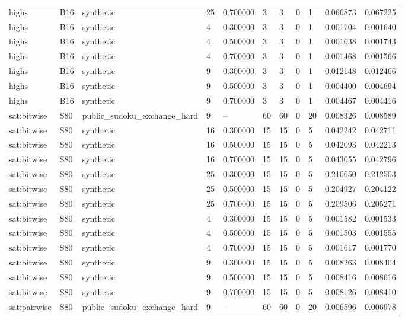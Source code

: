 \begin{tabular}{lllllllllll}
highs & B16 & synthetic & 25 & 0.700000 & 3 & 3 & 0 & 1 & 0.066873 & 0.067225 \\
highs & B16 & synthetic & 4 & 0.300000 & 3 & 3 & 0 & 1 & 0.001704 & 0.001640 \\
highs & B16 & synthetic & 4 & 0.500000 & 3 & 3 & 0 & 1 & 0.001638 & 0.001743 \\
highs & B16 & synthetic & 4 & 0.700000 & 3 & 3 & 0 & 1 & 0.001468 & 0.001566 \\
highs & B16 & synthetic & 9 & 0.300000 & 3 & 3 & 0 & 1 & 0.012148 & 0.012466 \\
highs & B16 & synthetic & 9 & 0.500000 & 3 & 3 & 0 & 1 & 0.004400 & 0.004694 \\
highs & B16 & synthetic & 9 & 0.700000 & 3 & 3 & 0 & 1 & 0.004467 & 0.004416 \\
sat:bitwise & S80 & public\_sudoku\_exchange\_hard & 9 & -- & 60 & 60 & 0 & 20 & 0.008326 & 0.008589 \\
sat:bitwise & S80 & synthetic & 16 & 0.300000 & 15 & 15 & 0 & 5 & 0.042242 & 0.042711 \\
sat:bitwise & S80 & synthetic & 16 & 0.500000 & 15 & 15 & 0 & 5 & 0.042093 & 0.042213 \\
sat:bitwise & S80 & synthetic & 16 & 0.700000 & 15 & 15 & 0 & 5 & 0.043055 & 0.042796 \\
sat:bitwise & S80 & synthetic & 25 & 0.300000 & 15 & 15 & 0 & 5 & 0.210650 & 0.212503 \\
sat:bitwise & S80 & synthetic & 25 & 0.500000 & 15 & 15 & 0 & 5 & 0.204927 & 0.204122 \\
sat:bitwise & S80 & synthetic & 25 & 0.700000 & 15 & 15 & 0 & 5 & 0.209506 & 0.205271 \\
sat:bitwise & S80 & synthetic & 4 & 0.300000 & 15 & 15 & 0 & 5 & 0.001582 & 0.001533 \\
sat:bitwise & S80 & synthetic & 4 & 0.500000 & 15 & 15 & 0 & 5 & 0.001503 & 0.001555 \\
sat:bitwise & S80 & synthetic & 4 & 0.700000 & 15 & 15 & 0 & 5 & 0.001617 & 0.001770 \\
sat:bitwise & S80 & synthetic & 9 & 0.300000 & 15 & 15 & 0 & 5 & 0.008263 & 0.008404 \\
sat:bitwise & S80 & synthetic & 9 & 0.500000 & 15 & 15 & 0 & 5 & 0.008416 & 0.008616 \\
sat:bitwise & S80 & synthetic & 9 & 0.700000 & 15 & 15 & 0 & 5 & 0.008126 & 0.008410 \\
sat:pairwise & S80 & public\_sudoku\_exchange\_hard & 9 & -- & 60 & 60 & 0 & 20 & 0.006596 & 0.006978 \\

\end{tabular}
